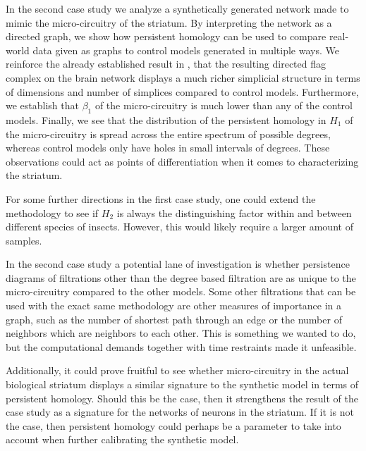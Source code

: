 In the second case study we analyze a synthetically generated network made to mimic the micro-circuitry of the striatum. By interpreting the network as a directed graph, we show how persistent homology can be used to compare real-world data given as graphs to control models generated in multiple ways. We reinforce the already established result in \cite{reimann}, that the resulting directed flag complex on the brain network displays a much richer simplicial structure in terms of dimensions and number of simplices compared to control models. Furthermore, we establish that $\beta_{1}$ of the micro-circuitry is much lower than any of the control models. Finally, we see that the distribution of the persistent homology in $H_{1}$ of the micro-circuitry is spread across the entire spectrum of possible degrees, whereas control models only have holes in small intervals of degrees. These observations could act as points of differentiation when it comes to characterizing the striatum.

For some further directions in the first case study, one could extend the methodology to see if $H_{2}$ is always the distinguishing factor within and between different species of insects. However, this would likely require a larger amount of samples.

In the second case study a potential lane of investigation is whether persistence diagrams of filtrations other than the degree based filtration are as unique to the micro-circuitry compared to the other models. Some other filtrations that can be used with the exact same methodology are other measures of importance in a graph, such as the number of shortest path through an edge or the number of neighbors which are neighbors to each other. This is something we wanted to do, but the computational demands together with time restraints made it unfeasible.

Additionally, it could prove fruitful to see whether micro-circuitry in the actual biological striatum displays a similar signature to the synthetic model in terms of persistent homology. Should this be the case, then it strengthens the result of the case study as a signature for the networks of neurons in the striatum. If it is not the case, then persistent homology could perhaps be a parameter to take into account when further calibrating the synthetic model.

